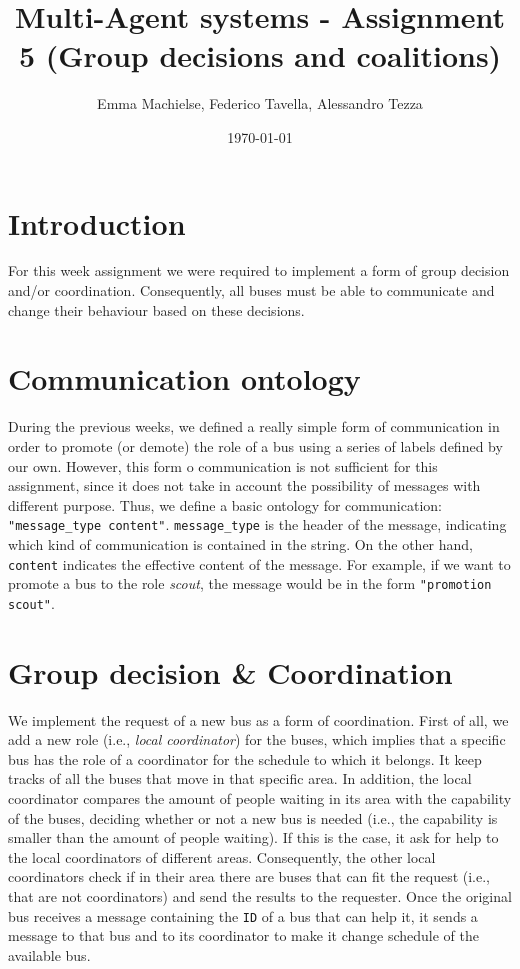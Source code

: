 \documentclass[a4paper]{article}
\title{Multi-Agent systems - Assignment 5 (Group decisions and coalitions)}
\author{Emma Machielse, Federico Tavella, Alessandro Tezza}
\date{\today}
\begin{document}
\maketitle

\section{Introduction}

For this week assignment we were required to implement a form of group decision and/or coordination. Consequently, all buses must be able to communicate and change their behaviour based on these decisions.

\section{Communication ontology}

During the previous weeks, we defined a really simple form of communication in order to promote (or demote) the role of a bus using a series of labels defined by our own. However, this form o communication is not sufficient for this assignment, since it does not take in account the possibility of messages with different purpose. Thus, we define a basic ontology for communication: \texttt{"message\_type content"}. \texttt{message\_type} is the header of the message, indicating which kind of communication is contained in the string. On the other hand, \texttt{content} indicates the effective content of the message. For example, if we want to promote a bus to the role \textit{scout}, the message would be in the form \texttt{"promotion scout"}.

\section{Group decision \& Coordination}

We implement the request of a new bus as a form of coordination. First of all, we add a new role (i.e., \textit{local coordinator}) for the buses, which implies that a specific bus has the role of a coordinator for the schedule to which it belongs. It keep tracks of all the buses that move in that specific area. In addition, the local coordinator compares the amount of people waiting in its area with the capability of the buses, deciding whether or not a new bus is needed (i.e., the capability is smaller than the amount of people waiting). If this is the case, it ask for help to the local coordinators of different areas. Consequently, the other local coordinators check if in their area there are buses that can fit the request (i.e., that are not coordinators) and send the results to the requester. Once the original bus receives a message containing the \texttt{ID} of a bus that can help it, it sends a message to that bus and to its coordinator to make it change schedule of the available bus. 
\end{document}
